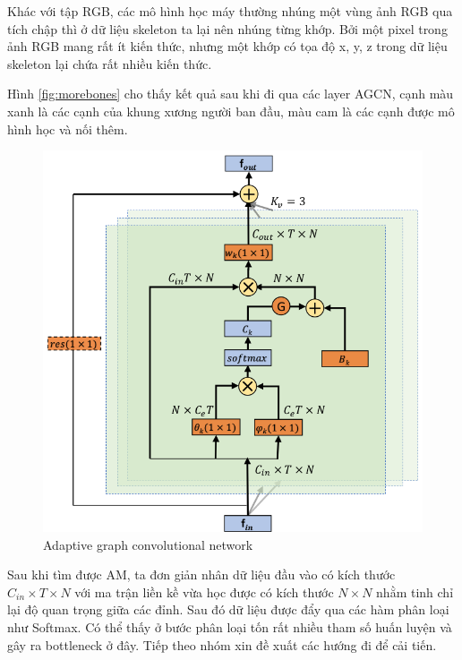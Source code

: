 Khác với tập RGB, các mô hình học máy thường nhúng một vùng ảnh RGB qua tích chập thì ở dữ liệu skeleton ta lại nên nhúng từng khớp. Bởi một pixel trong ảnh RGB mang rất ít kiến thức, nhưng một khớp có tọa độ x, y, z trong dữ liệu skeleton lại chứa rất nhiều kiến thức.

Hình \ref{fig:morebones} cho thấy kết quả sau khi đi qua các layer AGCN, cạnh màu xanh là các cạnh của khung xương người ban đầu, màu cam là các cạnh được mô hình học và nối thêm.

\begin{figure}[!ht]
    \begin{center}
        \includegraphics[width=\linewidth]{asset/image/agcn.png}
        \caption{Adaptive graph convolutional network}
        \label{fig:agcn}
    \end{center}
\end{figure}

Sau khi tìm được AM, ta đơn giản nhân dữ liệu đầu vào có kích thước $C_{in} \times T \times N$ với ma trận liền kề vừa học được có kích thước $N \times N$ nhằm tinh chỉ lại độ quan trọng giữa các đỉnh. Sau đó dữ liệu được đẩy qua các hàm phân loại như Softmax. Có thể thấy ở bước phân loại tốn rất nhiều tham số huấn luyện và gây ra bottleneck ở đây. Tiếp theo nhóm xin đề xuất các hướng đi để cải tiến.

